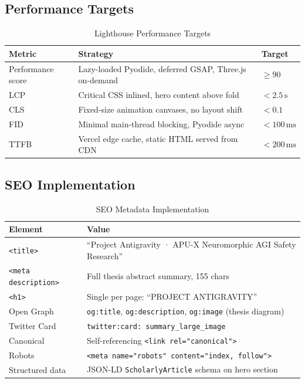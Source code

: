\documentclass[12pt, a4paper]{article}
\begin{document}
\subsection{Performance Targets}

\begin{table}[H]
  \centering
  \caption{Lighthouse Performance Targets}
  \small
  \begin{tabularx}{\textwidth}{l X l}
    \toprule
    \textbf{Metric} & \textbf{Strategy} & \textbf{Target} \\
    \midrule
    Performance score & Lazy-loaded Pyodide, deferred GSAP, Three.js on-demand & $\geq 90$ \\
    LCP & Critical CSS inlined, hero content above fold & $< 2.5\,\text{s}$ \\
    CLS & Fixed-size animation canvases, no layout shift & $< 0.1$ \\
    FID & Minimal main-thread blocking, Pyodide async & $< 100\,\text{ms}$ \\
    TTFB & Vercel edge cache, static HTML served from CDN & $< 200\,\text{ms}$ \\
    \bottomrule
  \end{tabularx}
\end{table}

\subsection{SEO Implementation}

\begin{table}[H]
  \centering
  \caption{SEO Metadata Implementation}
  \small
  \begin{tabularx}{\textwidth}{l X}
    \toprule
    \textbf{Element} & \textbf{Value} \\
    \midrule
    \texttt{<title>} & ``Project Antigravity · APU-X Neuromorphic AGI Safety Research'' \\
    \texttt{<meta description>} & Full thesis abstract summary, 155 chars \\
    \texttt{<h1>} & Single per page: ``PROJECT ANTIGRAVITY'' \\
    Open Graph & \texttt{og:title}, \texttt{og:description}, \texttt{og:image} (thesis diagram) \\
    Twitter Card & \texttt{twitter:card: summary\_large\_image} \\
    Canonical & Self-referencing \texttt{<link rel="canonical">} \\
    Robots & \texttt{<meta name="robots" content="index, follow">} \\
    Structured data & JSON-LD \texttt{ScholarlyArticle} schema on hero section \\
    \bottomrule
  \end{tabularx}
\end{table}
\end{document}
